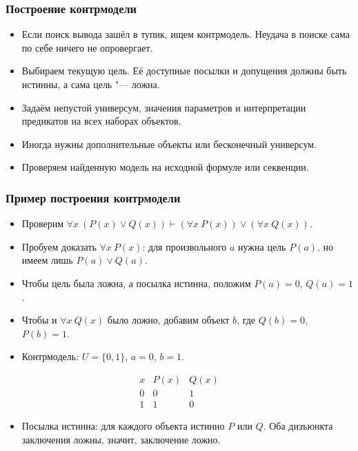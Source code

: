 \documentclass[10pt]{beamer}
\begin{document}
\begin{frame}
    \frametitle{Построение контрмодели}
    \begin{itemize}
        \item Если поиск вывода зашёл в тупик, ищем контрмодель. Неудача в поиске сама по себе ничего не опровергает. \pause
        \item Выбираем текущую цель. Её доступные посылки и допущения должны быть истинны, а сама цель "--- ложна.
        \item Задаём непустой универсум, значения параметров и интерпретации предикатов на всех наборах объектов. \pause
        \item Иногда нужны дополнительные объекты или бесконечный универсум.
        \item Проверяем найденную модель на исходной формуле или секвенции.
    \end{itemize}
\end{frame}

\begin{frame}
    \frametitle{Пример построения контрмодели}
    \begin{itemize}
        \item Проверим $\forall x~(P(x)\lor Q(x))\vdash(\forall x~P(x))\lor(\forall x~Q(x))$. \pause
        \item Пробуем доказать $\forall x~P(x)$: для произвольного $a$ нужна цель $P(a)$, но имеем лишь $P(a)\lor Q(a)$. \pause
        \item Чтобы цель была ложна, а посылка истинна, положим $P(a)=0$, $Q(a)=1$. \pause
        \item Чтобы и $\forall x~Q(x)$ было ложно, добавим объект $b$, где $Q(b)=0$, $P(b)=1$. \pause
        \item Контрмодель: $U=\{0,1\}$, $a=0$, $b=1$.
    \end{itemize}
    \vspace{-2pt}
    \[
        \begin{array}{c|cc}
            x & P(x) & Q(x) \\
            \hline
            0 & 0 & 1 \\
            1 & 1 & 0
        \end{array}
    \]
    \begin{itemize}
        \item Посылка истинна: для каждого объекта истинно $P$ или $Q$.
        Оба дизъюнкта заключения ложны, значит, заключение ложно.
    \end{itemize}
\end{frame}
\end{document}
